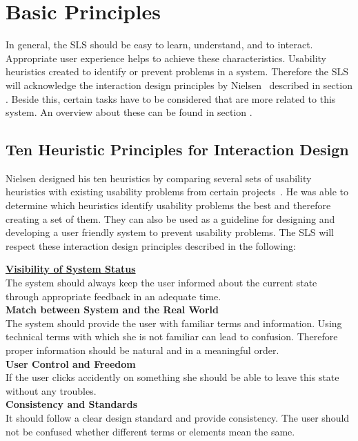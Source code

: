\section{Basic Principles}\label{4_1_general}
In general, the SLS should be easy to learn, understand, and to interact. Appropriate user experience helps to achieve these characteristics. Usability heuristics created to identify or prevent problems in a system. Therefore the SLS will acknowledge the interaction design principles by Nielsen~\cite{Nielsen_1994-he} described in section \textit{}. Beside this, certain tasks have to be considered that are more related to this system. An overview about these can be found in section \textit{}.

\subsection{Ten Heuristic Principles for Interaction Design}\label{nielsenDesignPrinciples}
Nielsen designed his ten heuristics by comparing several sets of usability heuristics with existing usability problems from certain projects~\cite{Nielsen_1994-he}. He was able to determine which heuristics identify usability problems the best and therefore creating a set of them. They can also be used as a guideline for designing and developing a user friendly system to prevent usability problems. The SLS will respect these interaction design principles described in the following:

\textbf{\hyperref[4_1_1_visibilitySystemStatus]{Visibility of System Status}}\\
The system should always keep the user informed about the current state through appropriate feedback in an adequate time.\\

\textbf{Match between System and the Real World}\\
The system should provide the user with familiar terms and information. Using technical terms with which she is not familiar can lead to confusion. Therefore proper information should be natural and in a meaningful order.\\

\textbf{User Control and Freedom}\\
If the user clicks accidently on something she should be able to leave this state without any troubles.\\

\textbf{Consistency and Standards}\\
It should follow a clear design standard and provide consistency. The user should not be confused whether different terms or elements mean the same.\\

